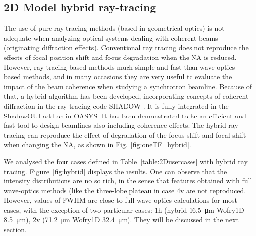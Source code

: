 \documentclass{iucr}              %
\begin{document}
\subsection{2D Model hybrid ray-tracing}
The use of pure ray tracing methods (based in geometrical optics) is not adequate when analyzing optical systems dealing with coherent beams (originating diffraction effects). Conventional ray tracing does not reproduce the effects of focal position shift and focus degradation when the NA is reduced. However, ray tracing-based methods much simple and fast than wave-optics-based methods, and in many occasions they are very useful to evaluate the impact of the beam coherence when studying a synchrotron beamline. Because of that, a hybrid \cite{codeHYBRID} algorithm has been developed, incorporating concepts of coherent diffraction in the ray tracing code SHADOW \cite{codeSHADOW}. It is fully   integrated in the ShadowOUI \cite{codeSHADOWOUI} add-on in OASYS. It has been demonstrated to be an efficient and fast tool to design beamlines also including coherence effects. The hybrid ray-tracing can reproduce the effect of degradation of the focus shift and focal shift when changing the NA, as shown in Fig.~\ref{fig:oneTF_hybrid}. 

We analysed the four cases defined in Table~\ref{table:2Dusercases} with hybrid ray tracing.  Figure~\ref{fig:hybrid} displays the results.  One can observe that the intensity distributions are no so rich, in the sense that  features obtained with full wave-optics methods (like the three-lobe plateau in case 4v are not reproduced. However, values of FWHM are close to full wave-optics calculations for most cases, with the exception of two particular cases:
1h (hybrid \SI{16.5}{\micro\meter} Wofry1D \SI{8.5}{\micro\meter}),
2v (\SI{71.2}{\micro\meter} Wofry1D \SI{32.4}{\micro\meter}). They will be discussed in the next section.

\newpage
\end{document}
